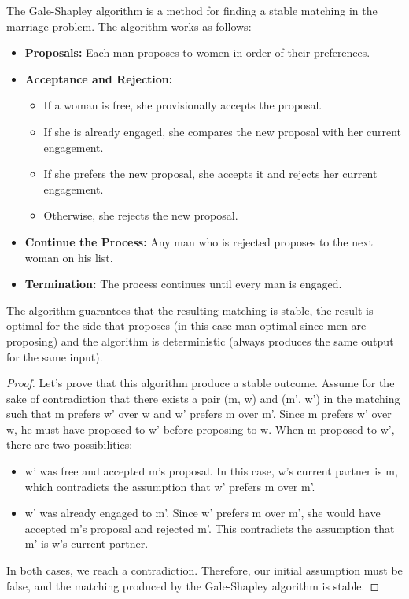 \begin{definition}
    The Gale-Shapley algorithm is a method for finding a stable matching in the marriage problem. The algorithm works as follows:
    \begin{itemize}[itemsep=1pt,label=$\circ$]
        \item \textbf{Proposals:} Each man proposes to women in order of their preferences.
        \item \textbf{Acceptance and Rejection:}
        \begin{itemize}[itemsep=1pt,label=$\circ$]
            \item If a woman is free, she provisionally accepts the proposal.
            \item If she is already engaged, she compares the new proposal with her current engagement. 
            \item If she prefers the new proposal, she accepts it and rejects her current engagement. 
            \item Otherwise, she rejects the new proposal.
        \end{itemize}
        \item \textbf{Continue the Process:} Any man who is rejected proposes to the next woman on his list.
        \item \textbf{Termination:} The process continues until every man is engaged.
    \end{itemize}
    The algorithm guarantees that the resulting matching is stable, the result is optimal for the side that proposes (in this case man-optimal since men are proposing) and the algorithm is deterministic (always produces the same output for the same input).
\end{definition}
\begin{proof}
    Let's prove that this algorithm produce a stable outcome. Assume for the sake of contradiction that there exists a pair (m, w) and (m', w') in the matching such that m prefers w' over w and w' prefers m over m'. Since m prefers w' over w, he must have proposed to w' before proposing to w. When m proposed to w', there are two possibilities:
    \begin{itemize}[itemsep=1pt,label=$\circ$]
        \item w' was free and accepted m's proposal. In this case, w's current partner is m, which contradicts the assumption that w' prefers m over m'.
        \item w' was already engaged to m'. Since w' prefers m over m', she would have accepted m's proposal and rejected m'. This contradicts the assumption that m' is w's current partner.
    \end{itemize}
    In both cases, we reach a contradiction. Therefore, our initial assumption must be false, and the matching produced by the Gale-Shapley algorithm is stable.
\end{proof}

